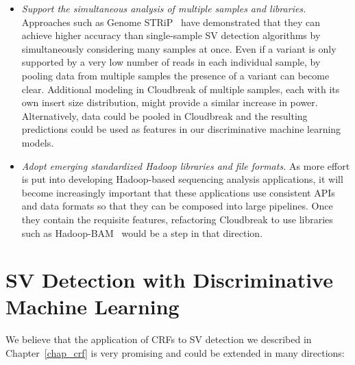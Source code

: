 \begin{itemize}
 \item \emph{Support the simultaneous analysis of multiple samples and libraries.} Approaches such as Genome STRiP~\cite{Handsaker:2011ki} have demonstrated that they can achieve higher accuracy than single-sample SV detection algorithms by simultaneously considering many samples at once. Even if a variant is only supported by a very low number of reads in each individual sample, by pooling data from multiple samples the presence of a variant can become clear. Additional modeling in Cloudbreak of multiple samples, each with its own insert size distribution, might provide a similar increase in power. Alternatively, data could be pooled in Cloudbreak and the resulting predictions could be used as features in our discriminative machine learning models.
 \item \emph{Adopt emerging standardized Hadoop libraries and file formats.} As more effort is put into developing Hadoop-based sequencing analysis applications, it will become increasingly important that these applications use consistent APIs and data formats so that they can be composed into large pipelines. Once they contain the requisite features, refactoring Cloudbreak to use libraries such as Hadoop-BAM~\cite{Niemenmaa:2012hu} would be a step in that direction.
\end{itemize}

\section{SV Detection with Discriminative Machine Learning}

We believe that the application of CRFs to SV detection we described in Chapter~\ref{chap_crf} is very promising and could be extended in many directions:

